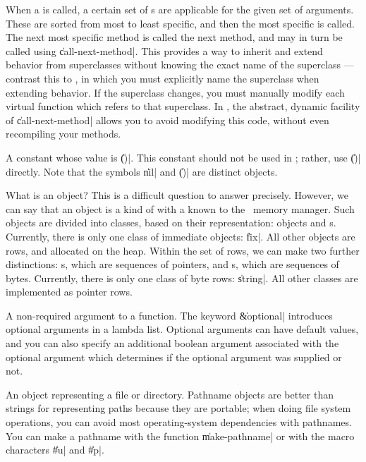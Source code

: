 \begin{description}
	{When a  is called, a certain set of
	s are applicable for the given set of arguments.
	These are sorted from most to least specific, and then the
	most specific is called.  The next most specific method is
	called the next method, and may in turn be called using
	\|call-next-method|.  This provides a way to inherit and
	extend behavior from superclasses without knowing the exact
	name of the superclass --- contrast this to \Cpp, in which you
	must explicitly name the superclass when extending behavior.
	If the superclass changes, you must manually modify each
	virtual function which refers to that superclass.  In \Talk,
	the abstract, dynamic facility of \|call-next-method| allows
	you to avoid modifying this code, without even recompiling
	your methods.}

	{A constant whose value is \|()|.  This constant should not be
	used in \Talk; rather, use \|()| directly.  Note that the
	symbols \|nil| and \|()| are distinct objects.}

	{What is an object?  This is a difficult question to answer
	precisely.  However, we can say that an object is a kind of
	 with a  known to the \Talk\ memory
	manager.  Such objects are divided into classes, based on
	their representation:   objects and
	s.  Currently, there is only one class of immediate
	objects:  \|fix|.  All other objects are rows, and
	allocated on the heap.  Within the set of rows, we can make
	two further distinctions:  s, which are
	sequences of pointers, and s, which are
	sequences of bytes.  Currently, there is only one class of
	byte rows:  \|string|.  All other classes are implemented as
	pointer rows.}
	
	{A non-required argument to a function.  The  keyword \|\&optional| introduces optional arguments in a
	lambda list.  Optional arguments can have default values, and
	you can also specify an additional boolean argument associated
	with the optional argument which determines if the optional
	argument was supplied or not.}

	{An object representing a file or directory.  Pathname objects
	are better than strings for representing paths because they
	are portable; when doing file system operations, you can avoid
	most operating-system dependencies with pathnames.  You can
	make a pathname with the function \|make-pathname| or with the
	macro characters \|\#u| and \|\#p|.}


\end{description}
